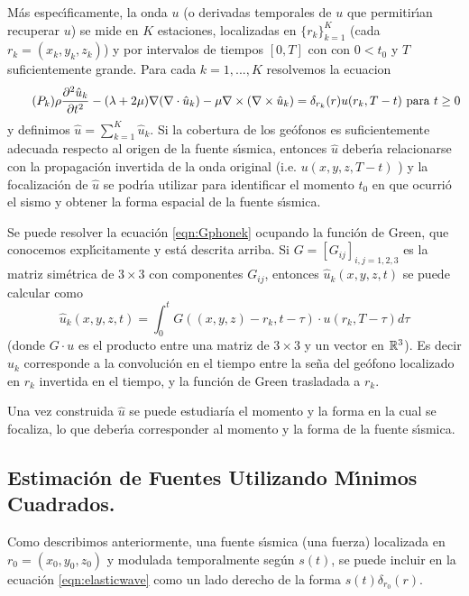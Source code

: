 M\'as espec\'{\i}ficamente, la onda $u$ (o derivadas temporales de $u$ que permitir\'{\i}an
recuperar $u$) se mide en $K$ estaciones, localizadas en
$\{r_k\}_{k=1}^K$ (cada $r_k=(x_k,y_k,z_k)$) y por intervalos de tiempos
$[0,T]$ con con $0<t_0$ y $T$ suficientemente grande.
Para cada $k=1,...,K$ resolvemos la ecuacion
\begin{align*}\tag{$P_k$}\label{eqn:Gphonek}
\rho\frac{\partial^2 \hat{u}_k}{\partial t^2}-(\lambda+2\mu)\nabla(\nabla\cdot \hat{u}_k)-\mu\nabla\times(\nabla\times \hat{u}_k)=\delta_{r_k}(r)u(r_k,T-t) \textnormal{ para }  t\geq0
\end{align*}
y definimos $\hat{u}=\sum_{k=1}^K\hat{u}_k$. Si la
cobertura de los ge\'ofonos es suficientemente adecuada respecto al
origen de la fuente s\'{\i}smica, entonces $\hat{u}$ deber\'{\i}a
relacionarse con la propagaci\'on invertida de la onda original
(i.e. $u(x,y,z,T-t)$ ) y la focalizaci\'on de
$\hat{u}$ se podr\'{\i}a utilizar para identificar el momento $t_0$ en que
ocurri\'o el sismo y obtener la forma espacial de
la fuente s\'{\i}smica.

Se puede resolver la ecuaci\'on  \eqref{eqn:Gphonek} ocupando la funci\'on de Green,
que conocemos expl\'{\i}citamente y est\'a descrita arriba.
Si $G=[G_{ij}]_{i,j=1,2,3}$ es la matriz sim\'etrica de $3\times3$ con componentes $G_{ij}$,
entonces $\hat{u}_k(x,y,z,t)$ se puede calcular como
$$\hat{u}_k(x,y,z,t)=\int_0^tG((x,y,z)-r_k,t-\tau)\cdot u(r_k,T-\tau)d\tau$$
(donde $G\cdot u$ es el producto entre una matriz de $3\times3$ y un vector en $\mathbb{R}^3$).
Es decir $\hat{u}_k$ corresponde a la convoluci\'on en el tiempo entre la se\~na  del ge\'ofono localizado
en $r_k$ invertida en el tiempo, y la funci\'on de Green trasladada a $r_k$.

Una vez construida $\hat{u}$ se puede estudiar\'{i}a el momento y la forma en la cual se focaliza, lo que
deber\'{\i}a corresponder al momento y la forma de la fuente s\'{\i}smica.

\subsection{Estimaci\'on de Fuentes Utilizando M\'{\i}nimos Cuadrados.}

Como describimos anteriormente, una fuente s\'{\i}smica
(una fuerza) localizada en $r_0=(x_0,y_0,z_0)$ y modulada
temporalmente seg\'un $s(t)$, se puede incluir en la ecuaci\'on \eqref{eqn:elasticwave}
como un lado derecho de la forma $s(t)\delta_{r_0}(r)$.

